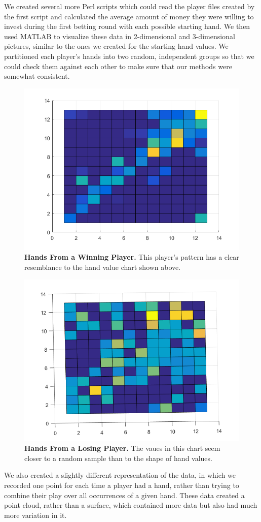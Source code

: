 \documentclass[11pt]{article}
\begin{document}
We created several more Perl scripts which could read the player files created by 
the first script and calculated the average amount of money they were willing 
to invest during the first betting round with each possible starting hand. We 
then used MATLAB to visualize these data in 2-dimensional and 3-dimensional
pictures, similar to the ones we created for the starting hand values. We partitioned
each player's hands into two random, independent groups so that we could check
them against each other to make sure that our methods were somewhat consistent.

\begin{figure}[ht!]
		\includegraphics[width=.45\textwidth]{AfsU.png}
  		\caption{\textbf{Hands From a Winning Player.} This player's pattern has
  		a clear resemblance to the hand value chart shown above.}
\end{figure}

\begin{figure}[ht!]
		\includegraphics[width=.45\textwidth]{Ag6G2.png}
  		\caption{\textbf{Hands From a Losing Player.} The vaues in this chart
  		seem closer to a random sample than to the shape of hand values.}
\end{figure}

We also created a slightly different representation of the data, in which we
recorded one point for each time a player had a hand, rather than trying to
combine their play over all occurrences of a given hand. These data
created a point cloud, rather than a surface, which contained more
data but also had much more variation in it.
\end{document}

